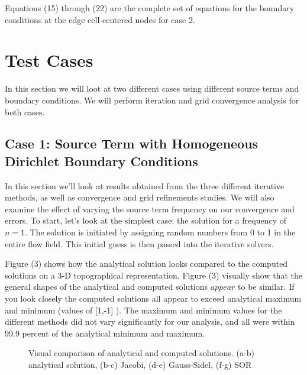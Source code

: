 \documentclass{article}
\begin{document}
\vspace{1em}

\noindent Equations (15) through (22) are the complete set of equations for the boundary conditions at the edge cell-centered nodes for case 2.

\section{Test Cases}

\noindent In this section we will loot at two different cases using different source terms and boundary conditions. We will perform iteration and grid convergence analysis for both cases.

\subsection{Case 1: Source Term with Homogeneous Dirichlet Boundary Conditions}

\noindent In this section we'll look at results obtained from the three different iterative methods, as well as convergence and grid refinements studies. We will also examine the effect of varying the source term frequency on our convergence and errors. To start, let's look at the simplest case: the solution for a frequency of $n = 1$. The solution is initiated by assigning random numbers from 0 to 1 in the entire flow field. This initial guess is then passed into the iterative solvers.

\vspace{1em}

\noindent Figure (3) shows how the analytical solution looks compared to the computed solutions on a 3-D topographical representation. Figure (3) visually show that the general shapes of the analytical and computed solutions $appear$ to be similar. If you look closely the computed solutions all appear to exceed analytical maximum and minimum (values of [1,-1] ). The maximum and minimum values for the different methods did not vary significantly for our analysis, and all were within 99.9 percent of the analytical minimum and maximum.

\newpage

\vspace{10em}

\begin{figure}[H]
\centering
\subfigure[]{\texttt{[image: p\_an3d]}\label{analytical function 3D}}
\subfigure[]{\texttt{[image: p\_an2d]}\label{analytical function 2D}}
\caption{Visual comparison of analytical and computed solutions. (a-b) analytical solution, (b-c) Jacobi, (d-e) Gauss-Sidel, (f-g) SOR }
\end{figure}
\end{document}
